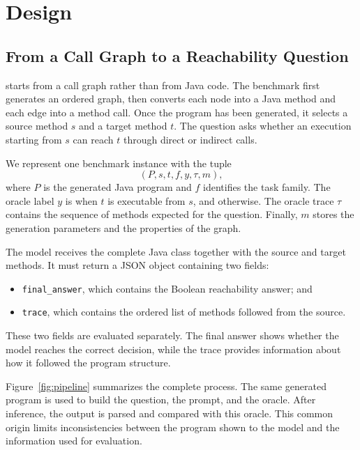 \section{\benchmark Design}
\label{sec:benchmark-design}



\subsection{From a Call Graph to a Reachability Question}

\benchmark starts from a call graph rather than from Java code. The benchmark first generates an ordered graph, then converts each node into a Java method and each edge into a method call. Once the program has been generated, it selects a source method $s$ and a target method $t$. The question asks whether an execution starting from $s$ can reach $t$ through direct or indirect calls.

We represent one benchmark instance with the tuple
\[
    (P, s, t, f, y, \tau, m),
\]
where $P$ is the generated Java program and $f$ identifies the task family. The oracle label $y$ is \true{} when $t$ is executable from $s$, and \false{} otherwise. The oracle trace $\tau$ contains the sequence of methods expected for the question. Finally, $m$ stores the generation parameters and the properties of the graph.

The model receives the complete Java class together with the source and target methods. It must return a JSON object containing two fields:
\begin{itemize}[leftmargin=*]
    \item \texttt{final\_answer}, which contains the Boolean reachability answer; and
    \item \texttt{trace}, which contains the ordered list of methods followed from the source.
\end{itemize}
These two fields are evaluated separately. The final answer shows whether the model reaches the correct decision, while the trace provides information about how it followed the program structure.

Figure~\ref{fig:pipeline} summarizes the complete process. The same generated program is used to build the question, the prompt, and the oracle. After inference, the output is parsed and compared with this oracle. This common origin limits inconsistencies between the program shown to the model and the information used for evaluation.

